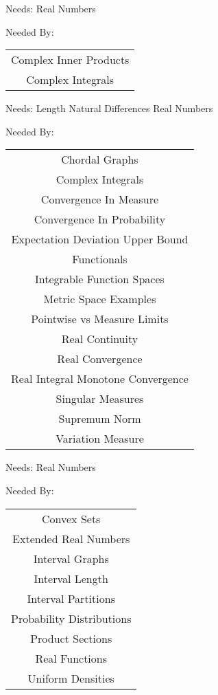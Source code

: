 \newpage
\label{complex_numbers}


\clearpage
Needs:  Real Numbers 

Needed By: \begin{tabular}{c} Complex Inner Products \\  Complex Integrals \\ 
\end{tabular}
\clearpage{}

\newpage
\label{absolute_value}


\clearpage
Needs:  Length  Natural Differences  Real Numbers 

Needed By: \begin{tabular}{c} Chordal Graphs \\  Complex Integrals \\  Convergence In Measure \\  Convergence In Probability \\  Expectation Deviation Upper Bound \\  Functionals \\  Integrable Function Spaces \\  Metric Space Examples \\  Pointwise vs Measure Limits \\  Real Continuity \\  Real Convergence \\  Real Integral Monotone Convergence \\  Singular Measures \\  Supremum Norm \\  Variation Measure \\ 
\end{tabular}
\clearpage{}

\newpage
\label{intervals}


\clearpage
Needs:  Real Numbers 

Needed By: \begin{tabular}{c} Convex Sets \\  Extended Real Numbers \\  Interval Graphs \\  Interval Length \\  Interval Partitions \\  Probability Distributions \\  Product Sections \\  Real Functions \\  Uniform Densities \\ 
\end{tabular}
\clearpage{}

